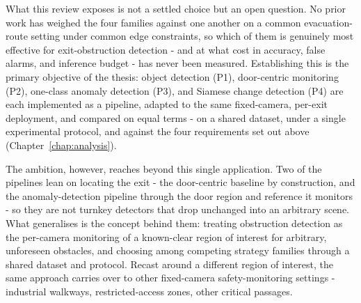 What this review exposes is not a settled choice but an open question. No prior
work has weighed the four families against one another on a common
evacuation-route setting under common edge constraints, so which of them is
genuinely most effective for exit-obstruction detection - and at what cost in
accuracy, false alarms, and inference budget - has never been measured.
Establishing this is the primary objective of the thesis: object detection
(P1), door-centric monitoring (P2), one-class anomaly detection (P3), and
Siamese change detection (P4) are each implemented as a pipeline, adapted to the
same fixed-camera, per-exit deployment, and compared on equal terms - on a
shared dataset, under a single experimental protocol, and against the four
requirements set out above (Chapter~\ref{chap:analysis}).

The ambition, however, reaches beyond this single application. Two of the
pipelines lean on locating the exit - the door-centric baseline by
construction, and the anomaly-detection pipeline through the door region and
reference it monitors - so they are not turnkey detectors that drop unchanged
into an arbitrary scene. What generalises is the concept behind them: treating
obstruction detection as the per-camera monitoring of a known-clear region of
interest for arbitrary, unforeseen obstacles, and choosing among competing
strategy families through a shared dataset and protocol. Recast around a
different region of interest, the same approach carries over to other
fixed-camera safety-monitoring settings - industrial walkways, restricted-access
zones, other critical passages.
